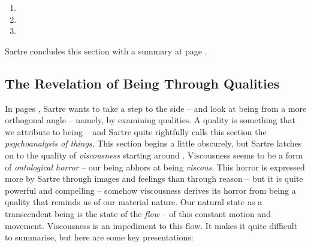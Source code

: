 \begin{enumerate}
  \item {}
  \item {}
  \item {}
\end{enumerate}

\noindent
Sartre concludes this section with a summary at page \autocite[776]{sartre}.

\subsection{The Revelation of Being Through Qualities}

In pages \autocite[777 -- 798]{sartre}, Sartre wants to take a step to the side -- and look at being from a more orthogonal angle -- namely, by examining qualities. A quality is something that we attribute to being -- and Sartre quite rightfully calls this section the \emph{psychoanalysis of things}. This section begins a little obscurely, but Sartre latches on to the quality of \emph{viscousness} starting around \autocite[784]{sartre}. Viscousness seems to be a form of \emph{ontological horror} -- our being abhors at being \emph{viscous}. This horror is expressed more by Sartre through images and feelings than through reason -- but it is quite powerful and compelling -- somehow viscousness derives its horror from being a quality that reminds us of our material nature. Our natural state as a transcendent being is the state of the \emph{flow} -- of this constant motion and movement. Viscousness is an impediment to this flow. It makes it quite difficult to summarise, but here are some key presentations:

